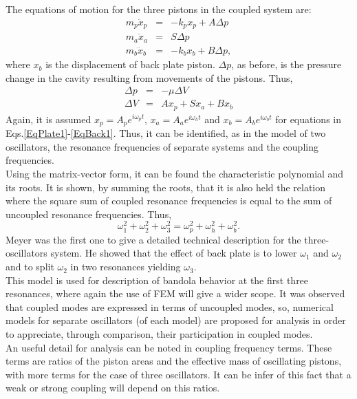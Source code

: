 The equations of motion for the three pistons in the coupled system are:
\begin{eqnarray}
m_{p}\ddot{x}_p & = & - k_p x_p  + A \Delta p
\label{EqPlate1}\\
m_{a}\ddot{x}_a & = & S \Delta p
\label{EqAir1}\\
m_{b}\ddot{x}_b & = & - k_b x_b  + B \Delta p,
\label{EqBack1}
\end{eqnarray}
where $x_b$ is the displacement of back plate piston.
$\Delta p$, as before, is the pressure change in the cavity resulting from movements of the pistons. Thus,
\begin{eqnarray*}
\Delta p & = & -\mu \Delta V\\
\Delta V & = & A x_p + S x_a + B x_b
\end{eqnarray*}
Again, it is assumed $x_p=A_p e^{i\omega_p t}$, $x_a=A_a e^{i\omega_h t}$ and $x_b=A_b e^{i\omega_b t}$ for equations in Eqs.\ref{EqPlate1}-\ref{EqBack1}. Thus, it can be identified, as in the model of two oscillators, the resonance frequencies of separate systems and the coupling frequencies.\\

Using the matrix-vector form, it can be found the characteristic polynomial and its roots. It is shown, by summing the roots, that it is also held the relation where the square sum of coupled resonance frequencies is equal to the sum of uncoupled resonance frequencies. Thus,
\begin{equation}
\omega_{1}^2 + \omega_{2}^2 + \omega_{3}^2 = \omega^2_p + \omega^2_h + \omega^2_b.
\label{Combination3}
\end{equation}
Meyer \cite{Meyer2} was the first one to give a detailed technical description for the three-oscillators system. He showed that the effect of back plate is to lower $\omega_1$ and $\omega_2$ and to split $\omega_2$ in two resonances yielding $\omega_3$.\\

This model is used for description of bandola behavior at the first three resonances, where again the use of FEM will give a wider scope. It was observed that coupled modes are expressed in terms of uncoupled modes, so, numerical models for separate oscillators (of each model) are proposed for analysis in order to appreciate, through comparison, their participation in coupled modes.\\

An useful detail for analysis can be noted in coupling frequency terms. These terms are ratios of the piston areas and the effective mass of oscillating pistons, with more terms for the case of three oscillators. It can be infer of this fact that a weak or strong coupling will depend on this ratios.